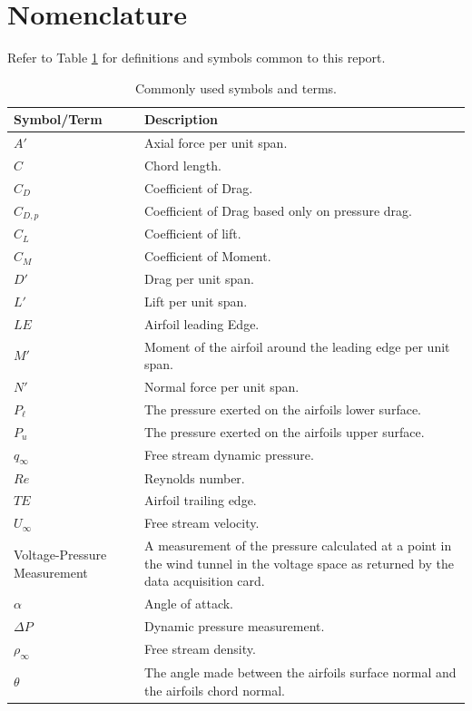 \documentclass[runningheads]{llncs}
\begin{document}


\section{Nomenclature}

Refer to Table \ref{tab:nomenclature} for definitions and symbols common to this report.

\begin{table}[h]
    \centering
    \begin{tabular}{p{4.5cm}p{11cm}}
        \toprule
        Symbol/Term & Description \\
        \midrule
        $A'$ & Axial force per unit span. \\
        $C$ & Chord length. \\
        $C_D$ & Coefficient of Drag. \\
        $C_{D,p}$ & Coefficient of Drag based only on pressure drag. \\
        $C_L$ & Coefficient of lift. \\
        $C_M$ & Coefficient of Moment. \\
        $D'$ & Drag per unit span. \\
        $L'$ & Lift per unit span.\\
        $LE$ & Airfoil leading Edge. \\
        $M'$ & Moment of the airfoil around the leading edge per unit span. \\
        $N'$ & Normal force per unit span. \\
        $P_\ell$ & The pressure exerted on the airfoils lower surface. \\
        $P_u$ & The pressure exerted on the airfoils upper surface. \\
        $q_\infty$ & Free stream dynamic pressure. \\
        $Re$ & Reynolds number. \\
        $TE$ & Airfoil trailing edge. \\
        $U_\infty$ & Free stream velocity. \\
        Voltage-Pressure Measurement & A measurement of the pressure calculated at a point in the wind tunnel in the voltage space as returned by the data acquisition card. \\
        $\alpha$ & Angle of attack. \\
        $\Delta P$ & Dynamic pressure measurement. \\
        $\rho_\infty$ & Free stream density. \\
        $\theta$ & The angle made between the airfoils surface normal and the airfoils chord normal. \\
        \bottomrule
    \end{tabular}
    \caption{Commonly used symbols and terms.}
    \label{tab:nomenclature}
\end{table}
\end{document}
